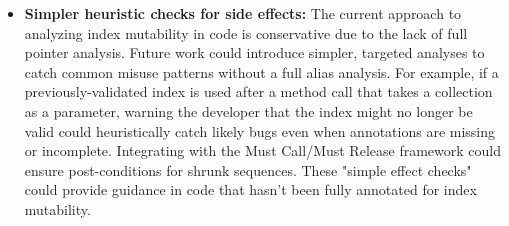 \begin{itemize}
\item
  \textbf{Simpler heuristic checks for side effects:}
    The current approach to analyzing index mutability in code is conservative due to the lack of
    full pointer analysis. Future work could introduce simpler, targeted analyses to catch common
    misuse patterns without a full alias analysis. For example, if a previously-validated index
    is used after a method call that takes a collection as a parameter, warning the developer that
    the index might no longer be valid could heuristically catch likely bugs even when annotations
    are missing or incomplete. Integrating with the Must Call/Must Release framework could ensure
    post-conditions for shrunk sequences. These "simple effect checks" could provide guidance in
    code that hasn't been fully annotated for index mutability.
\end{itemize}

